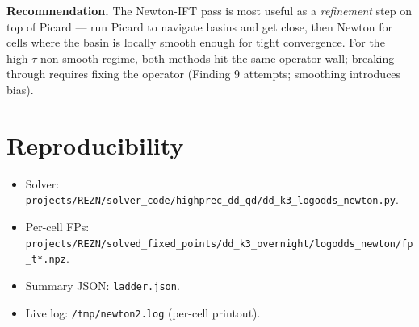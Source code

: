 \documentclass[11pt]{article}
\begin{document}
\textbf{Recommendation.} The Newton-IFT pass is most useful as a
\emph{refinement} step on top of Picard --- run Picard to navigate
basins and get close, then Newton for cells where the basin is
locally smooth enough for tight convergence. For the high-$\tau$
non-smooth regime, both methods hit the same operator wall;
breaking through requires fixing the operator (Finding 9 attempts;
smoothing introduces bias).

\section{Reproducibility}

\begin{itemize}\itemsep1pt
  \item Solver: \texttt{projects/REZN/solver\_code/highprec\_dd\_qd/dd\_k3\_logodds\_newton.py}.
  \item Per-cell FPs: \texttt{projects/REZN/solved\_fixed\_points/dd\_k3\_overnight/logodds\_newton/fp\_t*.npz}.
  \item Summary JSON: \texttt{ladder.json}.
  \item Live log: \texttt{/tmp/newton2.log} (per-cell printout).
\end{itemize}
\end{document}
